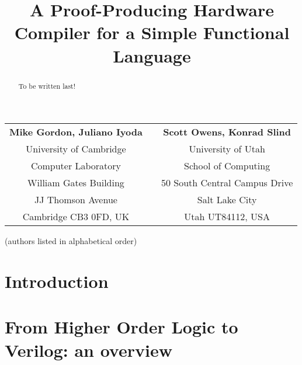\documentclass{llncs}
\title{A Proof-Producing Hardware Compiler for a Simple Functional Language}
\author{}
\institute{}
\begin{document}
\maketitle

\vspace*{-8mm}

\begin{center}
\begin{tabular}{ccc}
{\bf Mike Gordon, Juliano Iyoda} &\hspace*{5mm}& {\bf Scott Owens, Konrad Slind}\\
University of Cambridge          &\hspace*{5mm}& University of Utah\\
Computer Laboratory              &\hspace*{5mm}& School of Computing\\
William Gates Building           &\hspace*{5mm}& 50 South Central Campus Drive\\
JJ Thomson Avenue                &\hspace*{5mm}& Salt Lake City\\
Cambridge CB3 0FD, UK            &\hspace*{5mm}& Utah UT84112, USA
\end{tabular}


\vspace*{2mm}

(authors listed in alphabetical order)
\end{center}

\vspace*{-5mm}

\thispagestyle{empty}

\begin{abstract}
To be written last!
\end{abstract}

\section{Introduction}
\label{secIntroduction}



\section{From Higher Order Logic to Verilog: an overview}
\label{secHOL2Verilog}

\end{document}
